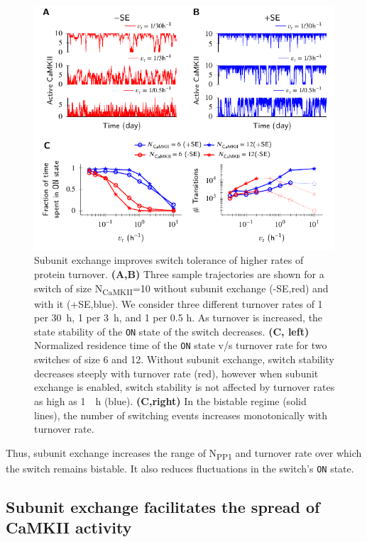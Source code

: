 \documentclass[9pt,lineno,doublespacing]{elife}
\newcommand\SUB[2]{#1\textsubscript{#2}}
\begin{document}
\begin{figure}[th!]
    \includegraphics[width=114mm]{./PaperFigures/elifeFigure3/figure_turnover_tolerance_114.pdf}
    \caption{Subunit exchange improves switch tolerance of higher rates of
        protein turnover.
        \textbf{(A,B)} Three sample trajectories are shown for a switch of 
        size \SUB{N}{CaMKII}=10 without subunit exchange
        (-SE,red) and with it (+SE,blue). We consider three different 
        turnover rates of 1 per \SI{30}{\hour}, 1 per \SI{3}{\hour}, 
        and 1 per 0.5 \si{\hour}. As turnover is increased, the state stability 
        of the \texttt{ON} state of the switch decreases.
        \textbf{(C, left)} Normalized residence time of the \texttt{ON} state v/s turnover
        rate for two switches of size 6 and 12. Without subunit exchange, switch
        stability decreases steeply with turnover rate (red), however when
        subunit exchange is enabled, switch stability is not affected by
        turnover rates as high as \SI{1}{\per \hour} (blue). \textbf{(C,right)} In
        the bistable regime (solid lines), the number of switching events
        increases monotonically with turnover rate.
    }\label{fig:turnover}
\end{figure}

Thus, subunit exchange increases the range of \SUB{N}{PP1} and turnover rate
over which the switch remains bistable. It also reduces fluctuations in the
switch's \texttt{ON} state.

\subsection{Subunit exchange facilitates the spread of CaMKII activity}
\label{res:spread_activity}
\end{document}
